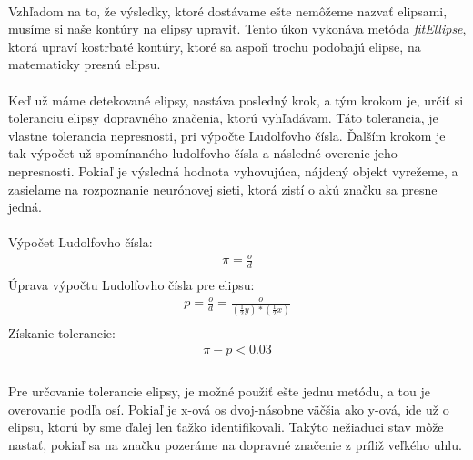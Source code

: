 \documentclass[12pt]{article}
\begin{document}
\paragraph{}
Vzhľadom na to, že výsledky, ktoré dostávame ešte nemôžeme nazvať elipsami, musíme si naše kontúry na elipsy upraviť.
Tento úkon vykonáva metóda \emph{fitEllipse}, ktorá upraví kostrbaté kontúry, ktoré sa aspoň trochu podobajú elipse, na matematicky presnú elipsu.
\paragraph{}
Keď už máme detekované elipsy, nastáva posledný krok, a tým krokom je, určiť si toleranciu elipsy dopravného značenia, ktorú vyhľadávam.
Táto tolerancia, je vlastne tolerancia nepresnosti, pri výpočte Ludolfovho čísla. 
Ďalším krokom je tak výpočet už spomínaného ludolfovho čísla a následné overenie jeho nepresnosti. 
Pokiaľ je výsledná hodnota vyhovujúca, nájdený objekt vyrežeme, a zasielame na rozpoznanie neurónovej sieti, ktorá zistí o akú značku sa presne jedná.
\paragraph{}
Výpočet Ludolfovho čísla:
\begin{align*}
          \pi = \frac{o}{d} \\
\end{align*}
Úprava výpočtu Ludolfovho čísla pre elipsu:
\begin{align*}
          p = \frac{o}{d} = \frac{o}{(\frac{1}{2} y) * ( \frac{1}{2} x)} \\
\end{align*}
Získanie tolerancie:
\begin{align*}
          \pi - p < 0.03 \\
\end{align*}
\paragraph{}
Pre určovanie tolerancie elipsy, je možné použiť ešte jednu metódu, a tou je overovanie podľa osí. 
Pokiaľ je x-ová os dvoj-násobne väčšia ako y-ová, ide už o elipsu, ktorú by sme ďalej len ťažko identifikovali. 
Takýto nežiaduci stav môže nastať, pokiaľ sa na značku pozeráme na dopravné značenie z príliž veľkého uhlu.
\end{document}
